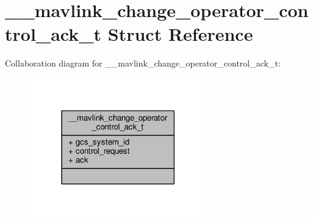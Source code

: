 \hypertarget{struct____mavlink__change__operator__control__ack__t}{\section{\+\_\+\+\_\+mavlink\+\_\+change\+\_\+operator\+\_\+control\+\_\+ack\+\_\+t Struct Reference}
\label{struct____mavlink__change__operator__control__ack__t}
}


Collaboration diagram for \+\_\+\+\_\+mavlink\+\_\+change\+\_\+operator\+\_\+control\+\_\+ack\+\_\+t\+:
\nopagebreak
\begin{figure}[H]
\begin{center}
\leavevmode
\includegraphics[width=218pt]{struct____mavlink__change__operator__control__ack__t__coll__graph}
\end{center}
\end{figure}
